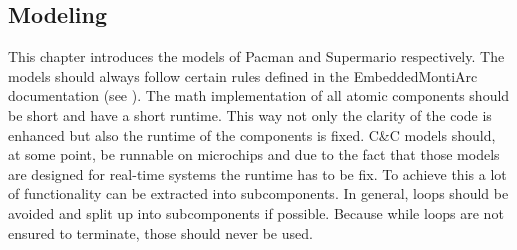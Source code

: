 

\subsection{Modeling}

This chapter introduces the models of Pacman and Supermario respectively.
The models should always follow certain rules defined in the EmbeddedMontiArc documentation (see \cite{emadoc}). The math implementation of all atomic components should be short and have a short runtime. This way not only the clarity of the code is enhanced but also the runtime of the components is fixed. C\&C models should, at some point, be runnable on microchips and due to the fact that those models are designed for real-time systems the runtime has to be fix.
To achieve this a lot of functionality can be extracted into subcomponents. In general, loops should be avoided and split up into subcomponents if possible. Because while loops are not ensured to terminate, those should never be used.




